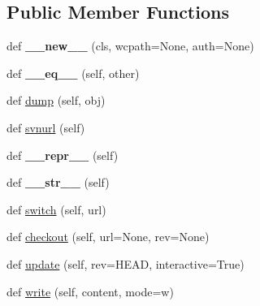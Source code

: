 \subsection*{Public Member Functions}
\begin{DoxyCompactItemize}
\item 
\mbox{\label{classpy_1_1__path_1_1svnwc_1_1_svn_w_c_command_path_ac1204a2afaa467193579f5a611572bc7}} 
def {\bfseries \+\_\+\+\_\+new\+\_\+\+\_\+} (cls, wcpath=None, auth=None)
\item 
\mbox{\label{classpy_1_1__path_1_1svnwc_1_1_svn_w_c_command_path_a84adfdfebd1c23c5a5bbb96f58c996b7}} 
def {\bfseries \+\_\+\+\_\+eq\+\_\+\+\_\+} (self, other)
\item 
def \hyperlink{classpy_1_1__path_1_1svnwc_1_1_svn_w_c_command_path_a250ca974ba44e11dacf9cfaf3484fb27}{dump} (self, obj)
\item 
def \hyperlink{classpy_1_1__path_1_1svnwc_1_1_svn_w_c_command_path_a395da4e38842efbc0d5b5b6997783423}{svnurl} (self)
\item 
\mbox{\label{classpy_1_1__path_1_1svnwc_1_1_svn_w_c_command_path_a664aac84a0edbdd8968c9541dc8a8a6b}} 
def {\bfseries \+\_\+\+\_\+repr\+\_\+\+\_\+} (self)
\item 
\mbox{\label{classpy_1_1__path_1_1svnwc_1_1_svn_w_c_command_path_a69c2e6d3381a6c35fe2872315baf197a}} 
def {\bfseries \+\_\+\+\_\+str\+\_\+\+\_\+} (self)
\item 
def \hyperlink{classpy_1_1__path_1_1svnwc_1_1_svn_w_c_command_path_a65dab9a733b47eef6226dbca90153786}{switch} (self, url)
\item 
def \hyperlink{classpy_1_1__path_1_1svnwc_1_1_svn_w_c_command_path_a8f6c6f449e1ed0e8372d3dcd38b50edf}{checkout} (self, url=None, rev=None)
\item 
def \hyperlink{classpy_1_1__path_1_1svnwc_1_1_svn_w_c_command_path_a40b48096fb12ee4d85bf75cb677d907f}{update} (self, rev=\textquotesingle{}H\+E\+AD\textquotesingle{}, interactive=True)
\item 
def \hyperlink{classpy_1_1__path_1_1svnwc_1_1_svn_w_c_command_path_a7ec8ca7e5a3273a5845a03e5ad11c3e9}{write} (self, content, mode=\textquotesingle{}w\textquotesingle{})

\end{DoxyCompactItemize}

